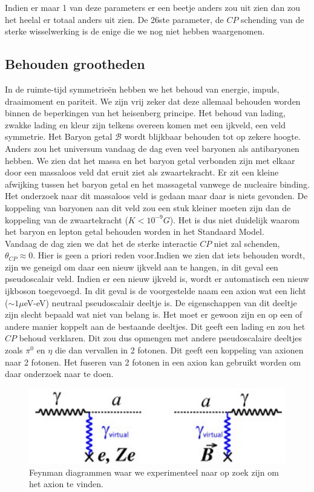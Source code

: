\documentclass[../main.tex]{subfiles}
\begin{document}
Indien er maar 1 van deze parameters er een beetje anders zou uit zien dan zou het heelal er totaal anders uit zien. De 26ste parameter, de $CP$ schending van de sterke wisselwerking is de enige die we nog niet hebben waargenomen.

\subsection{Behouden grootheden}%
\label{sub:behouden_grootheden}

In de ruimte-tijd symmetrieën hebben we het behoud van energie, impuls, draaimoment en pariteit. We zijn vrij zeker dat deze allemaal behouden worden binnen de beperkingen van het heisenberg principe. Het behoud van lading, zwakke lading en kleur zijn telkens overeen komen met een ijkveld, een veld symmetrie. Het Baryon getal $\mathcal{B}$ wordt blijkbaar behouden tot op zekere hoogte. Anders zou het universum vandaag de dag even veel baryonen als antibaryonen hebben. We zien dat het massa en het baryon getal verbonden zijn met elkaar door een massaloos veld dat eruit ziet als zwaartekracht. Er zit een kleine afwijking tussen het baryon getal en het massagetal vanwege de nucleaire binding. Het onderzoek naar dit massaloos veld is gedaan maar daar is niets gevonden. De koppeling van baryonen aan dit veld zou een stuk kleiner moeten zijn dan de koppeling van de zwaartekracht ($K<10^{-9}G$). Het is dus niet duidelijk waarom het baryon en lepton getal behouden worden in het Standaard Model.\\
Vandaag de dag zien we dat het de sterke interactie $CP$ niet zal schenden, $\theta_{C P} \approx 0$. Hier is geen a priori reden voor.Indien we zien dat iets behouden wordt, zijn we geneigd om daar een nieuw ijkveld aan te hangen, in dit geval een pseudoscalair veld. Indien er een nieuw ijkveld is, wordt er automatisch een nieuw ijkboson toegevoegd. In dit geval is de voorgestelde naam een axion wat een licht ($\sim 1\mu$eV-eV) neutraal pseudoscalair deeltje is. De eigenschappen van dit deeltje zijn slecht bepaald wat niet van belang is. Het moet er gewoon zijn en op een of andere manier koppelt aan de bestaande deeltjes. Dit geeft een lading en zou het $CP$ behoud verklaren. Dit zou dus opmengen met andere pseudoscalaire deeltjes zoals $\pi^0$ en $\eta$ die dan vervallen in 2 fotonen. Dit geeft een koppeling van axionen naar 2 fotonen. Het fuseren van 2 fotonen in een axion kan gebruikt worden om daar onderzoek naar te doen.

\begin{figure}[h]
    \centering
    \includegraphics[width=0.4\linewidth]{physics_beyond_the_standard_model/axion_diagrammen.png}
    \caption{Feynman diagrammen waar we experimenteel naar op zoek zijn om het axion te vinden.}%
    \label{fig:physics_beyond_the_standard_model/axion_diagrammen}
\end{figure}
\end{document}
